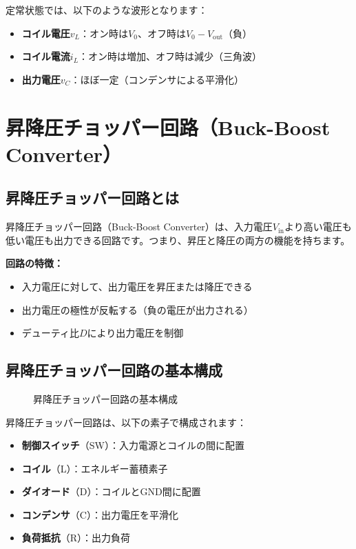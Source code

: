 定常状態では、以下のような波形となります：

\begin{itemize}
\item \textbf{コイル電圧$v_L$}：オン時は$V_0$、オフ時は$V_0 - V_{\text{out}}$（負）
\item \textbf{コイル電流$i_L$}：オン時は増加、オフ時は減少（三角波）
\item \textbf{出力電圧$v_C$}：ほぼ一定（コンデンサによる平滑化）
\end{itemize}

\section{昇降圧チョッパー回路（Buck-Boost Converter）}

\subsection{昇降圧チョッパー回路とは}

昇降圧チョッパー回路（Buck-Boost Converter）は、入力電圧$V_{\text{in}}$より高い電圧も低い電圧も出力できる回路です。つまり、昇圧と降圧の両方の機能を持ちます。

\textbf{回路の特徴：}

\begin{itemize}
\item 入力電圧に対して、出力電圧を昇圧または降圧できる
\item 出力電圧の極性が反転する（負の電圧が出力される）
\item デューティ比$D$により出力電圧を制御
\end{itemize}

\subsection{昇降圧チョッパー回路の基本構成}

\begin{figure}[H]
\centering
{}
\caption{昇降圧チョッパー回路の基本構成}
\label{fig:ch05_buckboost_circuit}
\end{figure}

昇降圧チョッパー回路は、以下の素子で構成されます：

\begin{itemize}
\item \textbf{制御スイッチ}（SW）：入力電源とコイルの間に配置
\item \textbf{コイル}（L）：エネルギー蓄積素子
\item \textbf{ダイオード}（D）：コイルとGND間に配置
\item \textbf{コンデンサ}（C）：出力電圧を平滑化
\item \textbf{負荷抵抗}（R）：出力負荷
\end{itemize}

